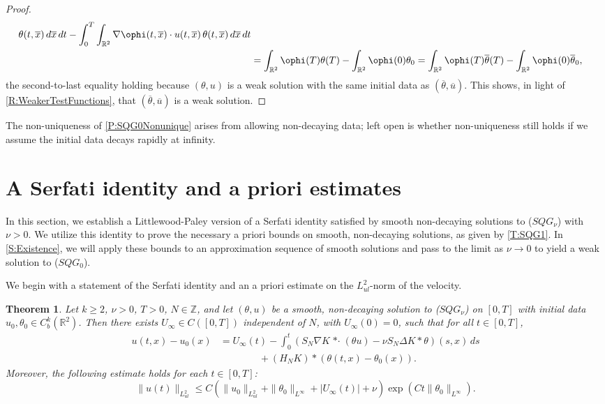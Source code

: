 \documentclass[11pt,reqno,xcolor=svgnames]{amsart}
\def\R{{\mathbb R}}
\def\Z{{\mathbb Z}}
\theoremstyle{plain}
\newtheorem{theorem}{Theorem}[section]
\theoremstyle{definition}
\theoremstyle{plain}
\theoremstyle{remark}
\newcommand{\grad}{\ensuremath{\nabla}}
\newcommand{\stardot}{{\mathop{* \cdot}}}
\newcommand{\ol}{\overline}
\newcommand{\ox}{{\ol{x}}}
\newcommand{\otheta}{\ol{\theta}}
\newcommand{\ou}{\ol{u}}
\begin{document}
\begin{proof}
\begin{align*}
                \theta(t, \ox)
                \, d \ox \, dt
                - \int_0^T \int_{\R^2}
                    \grad \ophi(t, \ox) \cdot
                    u(t, \ox) \, \theta(t, \ox)
                \, d \ox \, dt \\
            &= \int_{\R^2}\ophi(T)\theta(T)-\int_{\R^2} \ophi(0) \theta_0
            = \int_{\R^2}\ophi(T)\otheta(T)-\int_{\R^2} \ophi(0) \otheta_0,
    \end{align*}
    the second-to-last equality holding because $(\theta, u)$ is a weak solution with the same initial data as $(\otheta, \ou)$. This shows, in light of \cref{R:WeakerTestFunctions}, that $(\otheta, \ou)$ is a weak solution.
\end{proof}

The non-uniqueness of \cref{P:SQG0Nonunique} arises from allowing non-decaying data; left open is whether non-uniqueness still holds if we assume the initial data decays rapidly at infinity. 




\section{A Serfati identity and a priori estimates}\label{S:Apriori}
In this section, we establish a Littlewood-Paley version of a Serfati identity satisfied by smooth non-decaying solutions to ($SQG_{\nu}$) with $\nu>0$.  We utilize this identity to prove the necessary a priori bounds on smooth, non-decaying solutions, as given by \cref{T:SQG1}.  In \cref{S:Existence}, we will apply these bounds to an approximation sequence of smooth solutions and pass to the limit as $\nu\rightarrow 0$ to yield a weak solution to ($SQG_0$).

We begin with a statement of the Serfati identity and an a priori estimate on the $L^2_{ul}$-norm of the velocity. 

\begin{theorem}\label{theoremapriori}
Let $k\geq 2$, $\nu>0$, $T>0$, $N \in \Z$, and let $(\theta,u)$ be a smooth, non-decaying solution to ($SQG_{\nu}$) on $[0,T]$ with initial data $u_0,\theta_0\in C_b^k(\R^2)$.  Then there exists $U_{\infty}\in C([0,T])$ independent of $N$, with $U_{\infty}(0)=0$, such that for all $t\in [0,T]$,  
\begin{equation}\label{FourierSerfati2}
\begin{split}
u(t,x) - u_0(x)  &= U_{\infty}(t) -\int_0^t \left( S_{N}\nabla K \stardot (\theta u) -  \nu S_{N}\Delta K \ast \theta\right)(s,x) \, ds\\
&\qquad\qquad + (H_NK) \ast (\theta(t,x) - \theta_0(x)).
\end{split}
\end{equation}
Moreover, the following estimate holds for each $t\in [0,T]$:
\begin{equation}\label{L2ulestDSQG}
\| u(t) \|_{L^2_{ul}} \leq C\left(\| u_0 \|_{L^2_{ul}} + \|\theta_0 \|_{L^{\infty}} +|U_{\infty}(t)|+\nu\right)\exp \left( Ct\|\theta_0\|_{L^{\infty}}\right). 
\end{equation}  
\end{theorem}
\end{document}
